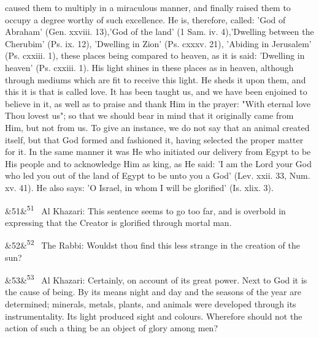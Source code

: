 \documentclass[12pt]{article}
\newcommand{\para}[1][]{\par\noindent\ifx&#1&\else\textsuperscript{\footnotesize #1}~\fi}
\begin{document}
caused them to multiply in a miraculous manner, and finally raised them to occupy a degree worthy of such excellence. He is, therefore, called: 'God of Abraham' (Gen. xxviii. 13),'God of the land' (1 Sam. iv. 4),'Dwelling between the Cherubim' (Ps. ix. 12), 'Dwelling in Zion' (Ps. cxxxv. 21), 'Abiding in Jerusalem' (Ps. cxxiii. 1), these places being compared to heaven, as it is said: 'Dwelling in heaven' (Ps. cxxiii. 1). His light shines in these places as in heaven, although through mediums which are fit to receive this light. He sheds it upon them, and this it is that is called love. It has been taught us, and we have been enjoined to believe in it, as well as to praise and thank Him in the prayer: "With eternal love Thou lovest us"; so that we should bear in mind that it originally came from Him, but not from us. To give an instance, we do not say that an animal created itself, but that God formed and fashioned it, having selected the proper matter for it. In the same manner it was He who initiated our delivery from Egypt to be His people and to acknowledge Him as king, as He said: 'I am the Lord your God who led you out of the land of Egypt to be unto you a God' (Lev. xxii. 33, Num. xv. 41). He also says: 'O Israel, in whom I will be glorified' (Is. xlix. 3).

\para[51] Al Khazari: This sentence seems to go too far, and is overbold in expressing that the Creator is glorified through mortal man.

\para[52] The Rabbi: Wouldst thou find this less strange in the creation of the sun?

\para[53] Al Khazari: Certainly, on account of its great power. Next to God it is the cause of being. By its means night and day and the seasons of the year are determined; minerals, metals, plants, and animals were developed through its instrumentality. Its light produced sight and colours. Wherefore should not the action of such a thing be an object of glory among men?
\end{document}
